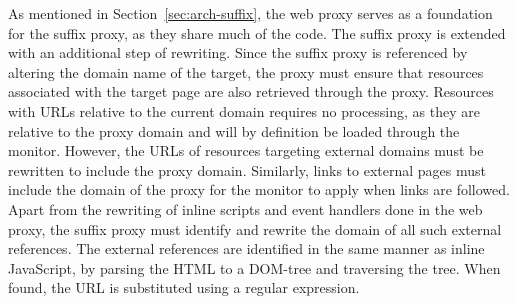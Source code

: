 \documentclass{llncs}
\begin{document}


%

As mentioned in Section~\ref{sec:arch-suffix}, the web proxy serves as a 
foundation for the suffix proxy, as they share much of the code. The suffix proxy is extended with an additional step of rewriting. 
Since the suffix proxy is referenced by altering the domain name of the target, 
the proxy must ensure that resources associated with the target page are also 
retrieved through the proxy. Resources with URLs relative to the current domain 
requires no processing, as they are relative to the proxy domain and will by 
definition be loaded through the monitor. 
However, the URLs of resources targeting external domains must be rewritten to 
include the proxy domain. Similarly, links to external pages must include the domain of the proxy
for the %
monitor%
to apply 
when links are followed.
Apart from the rewriting of inline 
scripts and event handlers done in the web proxy, the suffix proxy must 
identify and rewrite the domain of all such external references. 
The external references are identified in the same manner as inline JavaScript, 
by parsing the HTML to a DOM-tree and traversing the tree. When found, the 
URL is substituted using a regular expression.%
\end{document}

